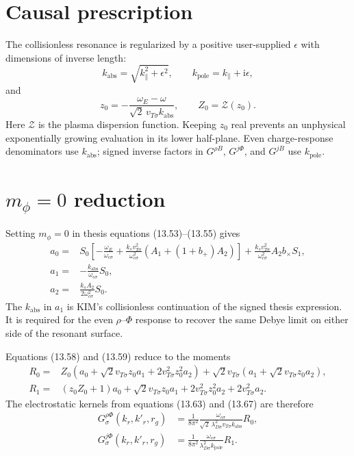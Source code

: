\documentclass[11pt]{article}
\newcommand{\ii}{\mathrm{i}}
\newcommand{\kpar}{k_{\parallel}}
\newcommand{\vth}{v_{T\sigma}}
\newcommand{\oc}{\omega_{c\sigma}}
\newcommand{\ld}{\lambda_{D\sigma}}
\newcommand{\Zp}{\mathcal{Z}}
\begin{document}
\section{Causal prescription}

The collisionless resonance is regularized by a positive user-supplied
$\epsilon$ with dimensions of inverse length:
\begin{equation}
 k_{\mathrm{abs}}=\sqrt{\kpar^2+\epsilon^2},\qquad
 k_{\mathrm{pole}}=\kpar+\ii\epsilon,
\end{equation}
and
\begin{equation}
 z_0=-\frac{\omega_E-\omega}
 {\sqrt{2}\,\vth k_{\mathrm{abs}}},\qquad
 Z_0=\Zp(z_0).
\end{equation}
Here $\Zp$ is the plasma dispersion function.  Keeping $z_0$ real prevents an
unphysical exponentially growing evaluation in its lower half-plane.  Even
charge-response denominators use $k_{\mathrm{abs}}$; signed inverse factors in
$G^{\rho B}$, $G^{j\Phi}$, and $G^{jB}$ use $k_{\mathrm{pole}}$.

\section{\texorpdfstring{$m_\phi=0$}{m-phi=0} reduction}

Setting $m_\phi=0$ in thesis equations (13.53)--(13.55) gives
\begin{align}
 a_0={}&S_0\left[-\frac{\omega_E}{\oc}
 +\frac{k_s\vth^2}{\oc^2}
   \left(A_1+(1+b_+)A_2\right)\right]
 +\frac{k_s\vth^2}{\oc^2}A_2b_\times S_1,\\
 a_1={}&-\frac{k_{\mathrm{abs}}}{\oc}S_0,\\
 a_2={}&\frac{k_s A_2}{2\oc^2}S_0.
\end{align}
The $k_{\mathrm{abs}}$ in $a_1$ is KIM's collisionless continuation of the
signed thesis expression.  It is required for the even $\rho$--$\Phi$
response to recover the same Debye limit on either side of the resonant
surface.

Equations (13.58) and (13.59) reduce to the moments
\begin{align}
 R_0={}&Z_0\left(a_0+\sqrt{2}\vth z_0a_1
                  +2\vth^2z_0^2a_2\right)
       +\sqrt{2}\vth\left(a_1+\sqrt{2}\vth z_0a_2\right),\\
 R_1={}&(z_0Z_0+1)a_0+\sqrt{2}\vth z_0a_1
       +2\vth^2z_0^2a_2+2\vth^2a_2.
\end{align}
The electrostatic kernels from equations (13.63) and (13.67) are therefore
\begin{align}
 G^{\rho\Phi}_\sigma(k_r,k'_r,r_g)
 &=\frac{1}{8\pi^2}
   \frac{\oc}{\sqrt{2}\,\ld^2\vth k_{\mathrm{abs}}}R_0,\label{eq:rhophi}\\
 G^{j\Phi}_\sigma(k_r,k'_r,r_g)
 &=\frac{1}{8\pi^2}
   \frac{\oc}{\ld^2 k_{\mathrm{pole}}}R_1.\label{eq:jphi}
\end{align}
\end{document}
